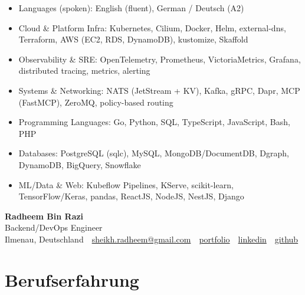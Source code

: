\documentclass[10pt,a4paper]{resume}
\makeatletter
\newcommand{\Portfolio}{https://radheem.github.io/my-cv}
\newcommand{\PortfolioText}{portfolio}
\newcommand{\GitHub}{https://github.com/radheem}
\newcommand{\LinkedIn}{https://www.linkedin.com/in/radheem-razi}
\newcommand{\Email}{sheikh.radheem@gmail.com}
\makeatother
\begin{document}
\begin{itemize}[leftmargin=1.4em,nosep,topsep=2pt]
  \item Languages (spoken): English (fluent), German / Deutsch (A2)
  \item Cloud \& Platform Infra: Kubernetes, Cilium, Docker, Helm, external-dns, Terraform, AWS (EC2, RDS, DynamoDB), kustomize, Skaffold
  \item Observability \& SRE: OpenTelemetry, Prometheus, VictoriaMetrics, Grafana, distributed tracing, metrics, alerting
  \item Systems \& Networking: NATS (JetStream + KV), Kafka, gRPC, Dapr, MCP (FastMCP), ZeroMQ, policy-based routing
  \item Programming Languages: Go, Python, SQL, TypeScript, JavaScript, Bash, PHP
  \item Databases: PostgreSQL (sqlc), MySQL, MongoDB/DocumentDB, Dgraph, DynamoDB, BigQuery, Snowflake
  \item ML/Data \& Web: Kubeflow Pipelines, KServe, scikit-learn, TensorFlow/Keras, pandas, ReactJS, NodeJS, NestJS, Django
\end{itemize}

\clearpage
{}

\begin{center}
  {\huge\bfseries Radheem Bin Razi}\\[3pt]
  {\large Backend/DevOps Engineer}\\[6pt]
  \small
  Ilmenau, Deutschland \,\textbar\,
  \href{mailto:\Email}{\Email} \,\textbar\,
  \href{\Portfolio}{\PortfolioText} \,\textbar\,
  \href{\LinkedIn}{linkedin} \,\textbar\,
  \href{\GitHub}{github}
\end{center}
\vspace{2pt}

\section{Berufserfahrung}
\end{document}
